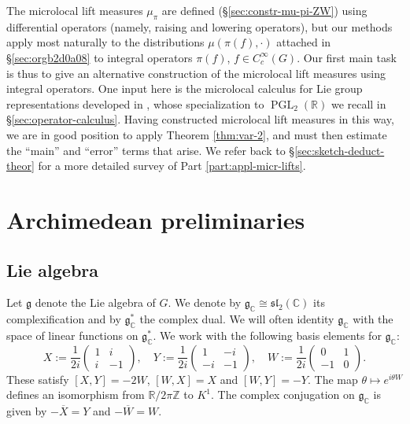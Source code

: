 \documentclass[reqno,10pt]{amsart}
\theoremstyle{plain} %
\theoremstyle{definition}
\theoremstyle{plain} %
\theoremstyle{remark}
\theoremstyle{itplain} %
\theoremstyle{remark} %
\numberwithin{equation}{section}
\def\slLie{\mathfrak{s}\mathfrak{l}}
\def\PGL{\operatorname{PGL}}
\begin{document}
The microlocal lift measures $\mu_\pi$ are defined (\S\ref{sec:constr-mu-pi-ZW}) using differential operators (namely, raising and lowering operators), but our methods apply most naturally to the distributions $\mu(\pi(f), \cdot)$ attached  in \S\ref{sec:orgb2d0a08} to integral operators $\pi(f)$, $f \in C_c^\infty(G)$.  Our first main task is thus to give an alternative construction of the microlocal lift measures using integral operators.  One input here is the microlocal calculus for Lie group representations developed in \cite{nelson-venkatesh-1}, whose specialization to $\PGL_2(\mathbb{R})$ we recall in \S\ref{sec:operator-calculus}.  Having constructed microlocal lift measures in this way, we are in good position to  apply Theorem \ref{thm:var-2}, and must then estimate the ``main'' and ``error'' terms that arise.  We refer back to \S\ref{sec:sketch-deduct-theor} for a more detailed survey of Part \ref{part:appl-micr-lifts}.



\section{Archimedean preliminaries}\label{sec:constr-irred-unit}

\subsection{Lie algebra}\label{sec:lie-algebra}
Let $\mathfrak{g}$ denote the Lie algebra of $G$.  We denote by $\mathfrak{g}_\mathbb{C} \cong \slLie_2(\mathbb{C})$ its complexification and by $\mathfrak{g}_\mathbb{C}^*$ the complex dual.  We will often identity $\mathfrak{g}_\mathbb{C}$ with the space of linear functions on $\mathfrak{g}_\mathbb{C}^*$.  We work with the following basis elements for $\mathfrak{g}_{\mathbb{C}}$:
\[
  X := \frac{1}{2 i}
  \begin{pmatrix}
    1 & i  \\
    i & -1
  \end{pmatrix}, \quad Y := \frac{1}{2 i}
  \begin{pmatrix}
    1  & -i \\
    -i & -1
  \end{pmatrix}, \quad W := \frac{1}{2 i}
  \begin{pmatrix}
    0  & 1 \\
    -1 & 0
  \end{pmatrix}.
\]
These satisfy $[X,Y] = - 2W$, $[W,X]= X$ and $[W,Y]= -Y$.  The map $\theta \mapsto e^{i \theta W}$ defines an isomorphism from $\mathbb{R}/2 \pi \mathbb{Z}$ to $K^1$.  The complex conjugation on $\mathfrak{g}_\mathbb{C}$ is given by $-\overline{X} = Y$ and $- \overline{W} = W$.
\end{document}
